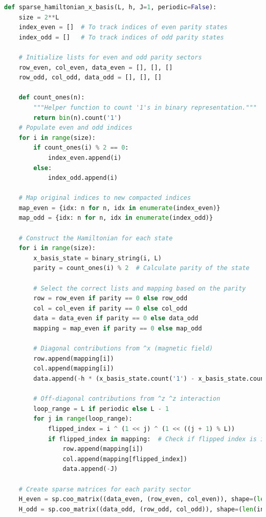 \documentclass[12pt]{article}
\begin{document}
\begin{lstlisting}[language=Python]
def sparse_hamiltonian_x_basis(L, h, J=1, periodic=False):
    size = 2**L
    index_even = []  # To track indices of even parity states
    index_odd = []   # To track indices of odd parity states

    # Initialize lists for even and odd parity sectors
    row_even, col_even, data_even = [], [], []
    row_odd, col_odd, data_odd = [], [], []

    def count_ones(n):
        """Helper function to count '1's in binary representation."""
        return bin(n).count('1')
    # Populate even and odd indices
    for i in range(size):
        if count_ones(i) % 2 == 0:
            index_even.append(i)
        else:
            index_odd.append(i)

    # Map original indices to new compacted indices
    map_even = {idx: n for n, idx in enumerate(index_even)}
    map_odd = {idx: n for n, idx in enumerate(index_odd)}

    # Construct the Hamiltonian for each state
    for i in range(size):
        x_basis_state = binary_string(i, L)
        parity = count_ones(i) % 2  # Calculate parity of the state

        # Select the correct lists and mapping based on the parity
        row = row_even if parity == 0 else row_odd
        col = col_even if parity == 0 else col_odd
        data = data_even if parity == 0 else data_odd
        mapping = map_even if parity == 0 else map_odd

        # Diagonal contributions from ^x (magnetic field)
        row.append(mapping[i])
        col.append(mapping[i])
        data.append(-h * (x_basis_state.count('1') - x_basis_state.count('0')))

        # Off-diagonal contributions from ^z ^z interaction
        loop_range = L if periodic else L - 1
        for j in range(loop_range):
            flipped_index = i ^ (1 << j) ^ (1 << ((j + 1) % L))
            if flipped_index in mapping:  # Check if flipped index is in the same parity
                row.append(mapping[i])
                col.append(mapping[flipped_index])
                data.append(-J)

    # Create sparse matrices for each parity sector
    H_even = sp.coo_matrix((data_even, (row_even, col_even)), shape=(len(index_even), len(index_even)), dtype=float).tocsr()
    H_odd = sp.coo_matrix((data_odd, (row_odd, col_odd)), shape=(len(index_odd), len(index_odd)), dtype=float).tocsr()


\end{lstlisting}
\end{document}
